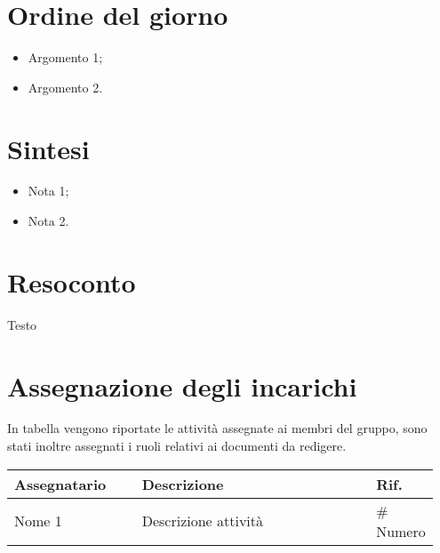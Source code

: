 \section{Ordine del giorno}
\begin{itemize}
    \item Argomento 1;
    \item Argomento 2.
\end{itemize}

\section{Sintesi}
\begin{itemize}
    \item Nota 1;
    \item Nota 2.
\end{itemize}

\section{Resoconto}
Testo

\section{Assegnazione degli incarichi}
In tabella vengono riportate le attività assegnate ai membri del gruppo, sono stati inoltre assegnati i ruoli relativi ai documenti da redigere.
\begin{center}
    {
    \renewcommand{\arraystretch}{1.5}
    \begin{tabular}{p{0.30\linewidth}p{0.55\linewidth}p{0.10\linewidth}}
        \textbf{Assegnatario}    &   \textbf{Descrizione}   & \textbf{Rif.}     \\
        \hline
        Nome 1    & Descrizione attività                    & \# Numero          \\
    \end{tabular}
    }
\end{center}
